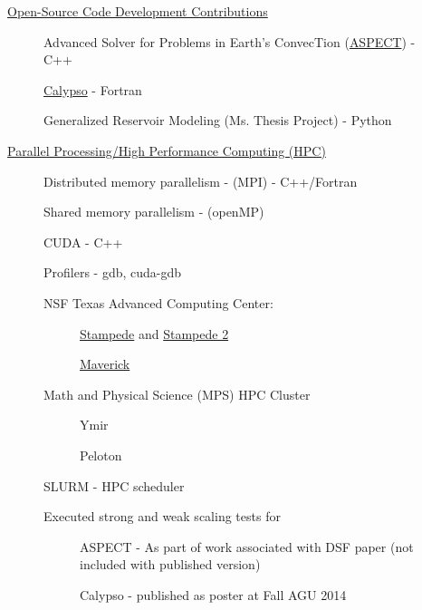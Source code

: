 \documentclass[11pt]{ltxdoc}
\begin{document}
\begin{description}
  \item[] \underline{Open-Source Code Development Contributions}
    \begin{description}
      \item[] Advanced Solver for Problems in Earth's ConvecTion (\href{https://aspect.geodynamics.org/}{ASPECT}) - C++
      \item[] \href{https://geodynamics.org/cig/software/calypso/}{Calypso} - Fortran
      \item[] Generalized Reservoir Modeling (Ms. Thesis Project) - Python
    \end{description}
  \item[] \underline{Parallel Processing/High Performance Computing (HPC)}
    \begin{description}
      \item[] Distributed memory parallelism - (MPI) - C++/Fortran
      \item[] Shared memory parallelism - (openMP)
      \item[] CUDA - C++
      \item[] Profilers - gdb, cuda-gdb
      \item[] NSF Texas Advanced Computing Center:
      \begin{description}
        \item[] \href{https://portal.xsede.org/tacc-stampede}{Stampede} and \href{https://portal.xsede.org/tacc-stampede2}{Stampede 2}
        \item[] \href{https://portal.xsede.org/tacc-maverick}{Maverick} 
      \end{description}
      \item[] Math and Physical Science (MPS) HPC Cluster
      \begin{description}
        \item[] Ymir
        \item[] Peloton
      \end{description}
      \item[] SLURM - HPC scheduler
      \item[] Executed strong and weak scaling tests for
      \begin{description}
        \item[] ASPECT - As part of work associated with DSF paper (not included with published version)
        \item[] Calypso - published as poster at Fall AGU 2014
      \end{description}

\end{description}
\end{description}
\end{document}
